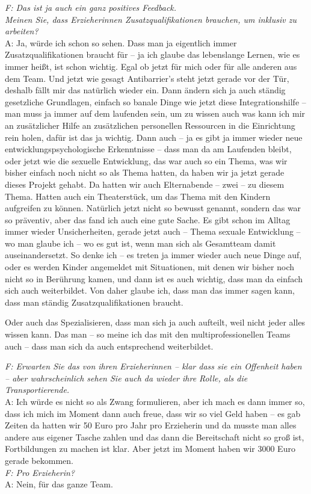 \begin{linenumbers*}
\emph{F: Das ist ja auch ein ganz positives Feedback.\\
Meinen Sie, dass Erzieherinnen Zusatzqualifikationen brauchen, um inklusiv zu arbeiten?}\\
A: Ja, würde ich schon so sehen. Dass man ja eigentlich immer Zusatzqualifikationen braucht für – ja ich glaube das lebenslange Lernen, wie es immer heißt, ist schon wichtig. Egal ob jetzt für  mich oder für alle anderen aus dem Team. Und jetzt wie gesagt Antibarrier's steht jetzt gerade vor der Tür,  deshalb fällt mir das natürlich wieder ein. Dann ändern sich ja auch ständig gesetzliche Grundlagen, einfach so banale Dinge wie jetzt diese Integrationshilfe – man muss ja immer auf dem laufenden sein, um zu wissen auch was kann ich mir an zusätzlicher Hilfe an zusätzlichen personellen Ressourcen in die Einrichtung rein holen, dafür ist das ja wichtig. Dann auch – ja es gibt ja immer wieder neue entwicklungspsychologische Erkenntnisse – dass man da am Laufenden bleibt, oder jetzt wie die sexuelle Entwicklung, das war auch so ein Thema, was wir bisher einfach noch nicht so als Thema hatten, da haben wir ja jetzt gerade dieses Projekt gehabt. Da hatten wir auch Elternabende – zwei – zu diesem Thema. Hatten auch ein Theaterstück, um das Thema mit den Kindern aufgreifen zu können. Natürlich jetzt nicht so bewusst genannt, sondern das war so präventiv, aber das fand ich auch eine gute Sache. Es gibt schon im Alltag immer wieder Unsicherheiten, gerade jetzt auch – Thema sexuale Entwicklung – wo man glaube ich – wo es gut ist, wenn man sich als Gesamtteam damit auseinandersetzt. So denke ich – es treten ja immer wieder auch neue Dinge auf, oder es werden Kinder angemeldet mit Situationen, mit denen wir bisher noch nicht so in Berührung kamen, und dann ist es auch wichtig, dass man da einfach sich auch weiterbildet. Von daher glaube ich, dass man das immer sagen kann, dass man ständig Zusatzqualifikationen braucht.

Oder auch das Spezialisieren, dass man sich ja auch aufteilt, weil nicht jeder alles wissen kann. Das man – so meine ich das mit den multiprofessionellen Teams auch – dass man sich da auch entsprechend weiterbildet.

\emph{F: Erwarten Sie das von ihren Erzieherinnen – klar dass sie ein Offenheit haben – aber wahrscheinlich sehen Sie auch da wieder ihre Rolle, als die Transportierende.}\\
A: Ich würde es nicht so als Zwang formulieren, aber ich mach es dann immer so, dass ich mich im Moment dann auch freue, dass wir so viel Geld haben – es gab Zeiten da hatten wir 50 Euro pro Jahr pro Erzieherin und da musste man alles andere aus eigener Tasche zahlen und das dann die Bereitschaft nicht so groß ist, Fortbildungen zu machen ist klar. Aber jetzt im Moment haben wir 3000 Euro gerade bekommen.\\
\emph{F: Pro Erzieherin?}\\
A: Nein, für das ganze Team. 


\end{linenumbers*}
